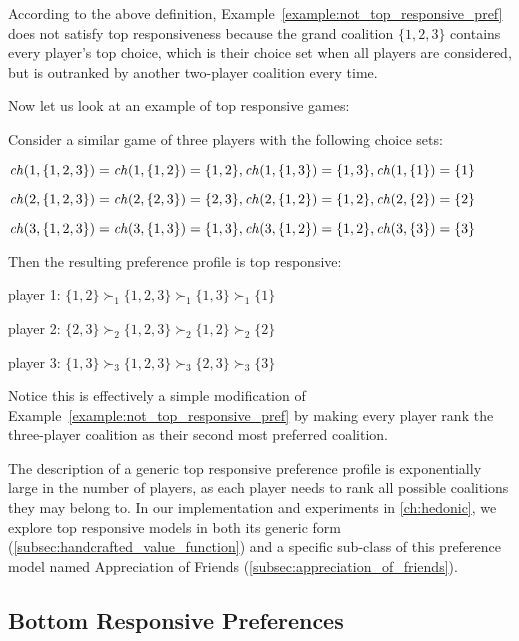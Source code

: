 According to the above definition, Example~\ref{example:not_top_responsive_pref}
does not satisfy top responsiveness because the grand coalition $\{1, 2, 3\}$
contains every player's top choice, which is their choice set when all players
are considered, but is outranked by another two-player coalition every time.

Now let us look at an example of top responsive games:

\begin{example}
\label{example:top_responsive_pref}
  Consider a similar game of three players with the following choice sets:

  $\mathit{ch}(1, \{1, 2, 3\}) = \mathit{ch}(1, \{1, 2\}) = \{1, 2\},
   \mathit{ch}(1, \{1, 3\}) = \{1, 3\}, \mathit{ch}(1, \{1\}) = \{1\}$

  $\mathit{ch}(2, \{1, 2, 3\}) = \mathit{ch}(2, \{2, 3\}) = \{2, 3\},
   \mathit{ch}(2, \{1, 2\}) = \{1, 2\}, \mathit{ch}(2, \{2\}) = \{2\}$

  $\mathit{ch}(3, \{1, 2, 3\}) = \mathit{ch}(3, \{1, 3\}) = \{1, 3\},
   \mathit{ch}(3, \{1, 2\}) = \{1, 2\}, \mathit{ch}(3, \{3\}) = \{3\}$

  Then the resulting preference profile is top responsive:

  player 1: $\{1, 2\} \succ_1 \{1, 2, 3\} \succ_1 \{1, 3\} \succ_1  \{1\}$

  player 2: $\{2, 3\} \succ_2 \{1, 2, 3\} \succ_2 \{1, 2\} \succ_2  \{2\}$

  player 3: $\{1, 3\} \succ_3 \{1, 2, 3\} \succ_3 \{2, 3\} \succ_3  \{3\}$

  Notice this is effectively a simple modification of
  Example~\ref{example:not_top_responsive_pref} by making every player rank
  the three-player coalition as their second most preferred coalition.
\end{example}

The description of a generic top responsive preference profile is exponentially
large in the number of players, as each player needs to rank all possible
coalitions they may belong to.
In our implementation and experiments in \autoref{ch:hedonic}, we explore
top responsive models in both its generic form
(\autoref{subsec:handcrafted_value_function}) and a specific sub-class of
this preference model named Appreciation of Friends
(\autoref{subsec:appreciation_of_friends}).

\subsection{Bottom Responsive Preferences}
\label{subsec:bottom_responsive_preferences}

